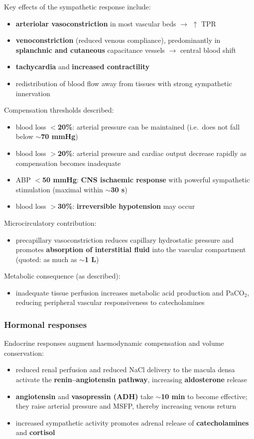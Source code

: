 \documentclass[11pt,a4paper]{article}
\begin{document}
Key effects of the sympathetic response include:
\begin{itemize}
\item \textbf{arteriolar vasoconstriction} in most vascular beds $\rightarrow$ $\uparrow$ TPR
\item \textbf{venoconstriction} (reduced venous compliance), predominantly in \textbf{splanchnic and cutaneous} capacitance vessels $\rightarrow$ central blood shift
\item \textbf{tachycardia} and \textbf{increased contractility}
\item redistribution of blood flow away from tissues with strong sympathetic innervation
\end{itemize}

Compensation thresholds described:
\begin{itemize}
\item blood loss \textbf{$<$20\%}: arterial pressure can be maintained (i.e.\ does not fall below \textbf{$\sim$70 mmHg})
\item blood loss \textbf{$>$20\%}: arterial pressure and cardiac output decrease rapidly as compensation becomes inadequate
\item ABP \textbf{$<$50 mmHg}: \textbf{CNS ischaemic response} with powerful sympathetic stimulation (maximal within \textbf{$\sim$30 s})
\item blood loss \textbf{$>$30\%}: \textbf{irreversible hypotension} may occur
\end{itemize}

Microcirculatory contribution:
\begin{itemize}
\item precapillary vasoconstriction reduces capillary hydrostatic pressure and promotes \textbf{absorption of interstitial fluid} into the vascular compartment (quoted: as much as \textbf{$\sim$1 L})
\end{itemize}

Metabolic consequence (as described):
\begin{itemize}
\item inadequate tissue perfusion increases metabolic acid production and PaCO$_2$, reducing peripheral vascular responsiveness to catecholamines
\end{itemize}

\subsubsection{Hormonal responses}
Endocrine responses augment haemodynamic compensation and volume conservation:
\begin{itemize}
\item reduced renal perfusion and reduced NaCl delivery to the macula densa activate the \textbf{renin--angiotensin pathway}, increasing \textbf{aldosterone} release
\item \textbf{angiotensin} and \textbf{vasopressin (ADH)} take \textbf{$\sim$10 min} to become effective; they raise arterial pressure and MSFP, thereby increasing venous return
\item increased sympathetic activity promotes adrenal release of \textbf{catecholamines} and \textbf{cortisol}
\end{itemize}
\end{document}
